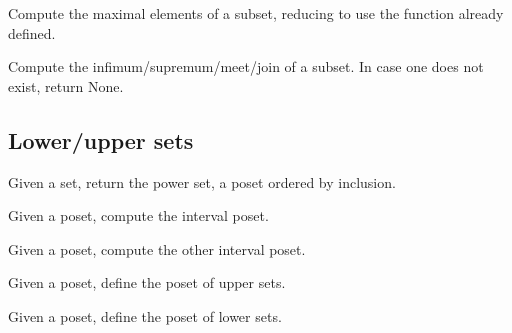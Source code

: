 \begin{gradedexercise}
  Compute the maximal elements of a subset, reducing
  to use the function  already defined.


\end{gradedexercise}


\begin{gradedexercise}
  Compute the infimum/supremum/meet/join of a subset.
  In case one does not exist, return None.


\end{gradedexercise}

\subsection{Lower/upper sets}
\begin{gradedexercise}
  Given a set, return the power set, a poset ordered by inclusion.

\end{gradedexercise}


\begin{gradedexercise}
  Given a poset, compute the interval poset.

\end{gradedexercise}


\begin{gradedexercise}
  Given a poset, compute the other interval poset.

\end{gradedexercise}


\begin{gradedexercise}
  Given a poset, define the poset of upper sets.

\end{gradedexercise}

\begin{gradedexercise}
  Given a poset, define the poset of lower sets.
\end{gradedexercise}


